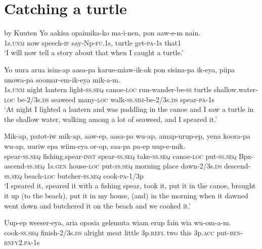 \section{Catching a turtle} 
 by Kuuten  
\ea
\gll  Yo  aakisa  opaimika-ko  ma-i-nen,  pon  aaw-e-m  nain. \\
1s.\textsc{unm}  now  speech-\textsc{if}  say-Np-\textsc{fu}.1s,  turtle  get-\textsc{pa}-1s  that1 \\
\glt ‘I will now tell a story about that when I caught a turtle.’ \\
\z


\ea
\gll  Yo  uura  arua  isim-ap  aasa-pa  karue-miaw-ik-ok           pon  sisina-pa  ik-eya,  piipa  unowa-pa               soomar-em-ik-eya  mik-a-m. \\
1s.\textsc{unm}  night  lantern  light-\textsc{ss.seq}  canoe-\textsc{loc}  run-wander-be-\textsc{ss}  turtle  shallow.water-\textsc{loc}  be-2/3s.\textsc{ds}  seaweed  many-\textsc{loc} walk-\textsc{ss}.\textsc{sim}-be-2/3s.\textsc{ds}  spear-\textsc{pa}-1s \\




\glt ‘At night I lighted a lantern and was paddling in the canoe and I saw a turtle in the shallow water, walking among a lot of seaweed, and I speared it.’ \\
\z


\ea
\gll  Mik-ap,  patot-iw  mik-ap,  aaw-ep,                    aasa-pa  wu-ap,  amap-urup-ep,  yena  koora-pa             wu-ap,  uuriw  epa  wiim-eya  or-op,                     saa-pa  pa-ep  uup-e-mik. \\
 spear-\textsc{ss.seq}  fishing.spear-\textsc{inst}  spear-\textsc{ss.seq}  take-\textsc{ss.seq}  canoe-\textsc{loc}  put-\textsc{ss.seq}  Bpx-ascend-\textsc{ss.seq}  1s.\textsc{gen}  house-\textsc{loc}  put-\textsc{ss.seq}  morning  place  dawn-2/3s.\textsc{ds}  descend-\textsc{ss.seq}   beach-\textsc{loc}  butcher{}-\textsc{ss.seq}  cook-\textsc{pa}-1/3p \\






\glt ‘I speared it, speared it with a fishing spear, took it, put it in the canoe, brought it up (to the beach), put it in my house, (and) in the morning when it dawned went down and butchered it on the beach and we cooked it.’ \\
\z


\ea
\gll  Uup-ep  weeser-eya,  aria  oposia  gelemuta  wiam  erup     fain  wia  wu-om-a-m. \\
 cook-\textsc{ss.seq}  finish-2/3s.\textsc{ds}  alright  meat  little  3p.\textsc{refl}  two  this  3p.\textsc{acc}  put-\textsc{ben}-\textsc{bnfy}2.\textsc{pa}-1s \\


